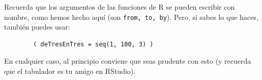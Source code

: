 \documentclass[10pt,a4paper]{article}\usepackage[]{graphicx}\usepackage[]{color}
\begin{document}
Recuerda que los argumentos de las funciones de R se pueden escribir con nombre, como hemos hecho aquí (son {\tt from, to, by}). Pero, si sabes lo que haces, también puedes usar:
    \begin{verbatim}
        ( deTresEnTres = seq(1, 100, 3) )
    \end{verbatim}
En cualquier caso, al principio conviene que seas prudente con esto (y recuerda que el tabulador es tu amigo en RStudio).\\
%
%
%
\end{document}
